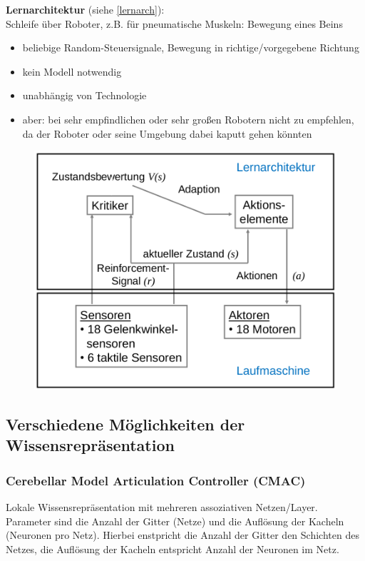 \textbf{Lernarchitektur} (siehe \autoref{lernarch}):\\
Schleife über Roboter, z.B. für pneumatische Muskeln: Bewegung eines Beins
\begin{itemize}
\item beliebige Random-Steuersignale, Bewegung in richtige/vorgegebene Richtung
\item kein Modell notwendig
\item unabhängig von Technologie
\item aber: bei sehr empfindlichen oder sehr großen Robotern nicht zu empfehlen, da der Roboter oder seine Umgebung dabei kaputt gehen könnten
\end{itemize}
\begin{figure}[h!]
	\centering
	\includegraphics[width=.7\textwidth]{figures/lernarchitektur.png}
	\caption{}
	\label{lernarch}
\end{figure}

\subsection{Verschiedene Möglichkeiten der Wissensrepräsentation}

\subsubsection{Cerebellar Model Articulation Controller (CMAC)}
Lokale Wissensrepräsentation mit mehreren assoziativen Netzen/Layer. Parameter sind die Anzahl der Gitter (Netze) und die Auflösung der Kacheln (Neuronen pro Netz).
Hierbei enstpricht die Anzahl der Gitter den Schichten des Netzes, die Auflösung der Kacheln entspricht Anzahl der Neuronen im Netz.
